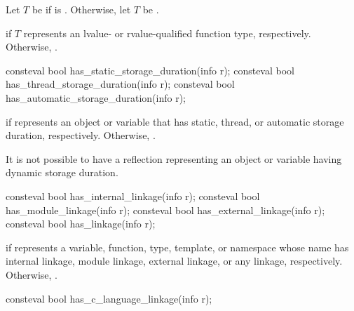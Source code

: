 \begin{itemdescr}
\pnum
Let $T$ be  if  is .
Otherwise, let $T$ be .

\pnum
\returns
{} if $T$ represents an
lvalue- or rvalue-qualified function type, respectively.
Otherwise, .
\end{itemdescr}

%
%
%
\begin{itemdecl}
consteval bool has_static_storage_duration(info r);
consteval bool has_thread_storage_duration(info r);
consteval bool has_automatic_storage_duration(info r);
\end{itemdecl}

\begin{itemdescr}
\pnum
\returns
{} if  represents an object or variable that has
static, thread, or automatic storage duration, respectively.
Otherwise, .
\begin{note}
It is not possible to have a reflection
representing an object or variable having dynamic storage duration.
\end{note}
\end{itemdescr}

%
%
%
%
\begin{itemdecl}
consteval bool has_internal_linkage(info r);
consteval bool has_module_linkage(info r);
consteval bool has_external_linkage(info r);
consteval bool has_linkage(info r);
\end{itemdecl}

\begin{itemdescr}
\pnum
\returns
{} if  represents a
variable,
function,
type,
template, or
namespace
whose name has
internal linkage,
module linkage,
external linkage, or
any linkage, respectively.
Otherwise, .
\end{itemdescr}

%
\begin{itemdecl}
consteval bool has_c_language_linkage(info r);
\end{itemdecl}

